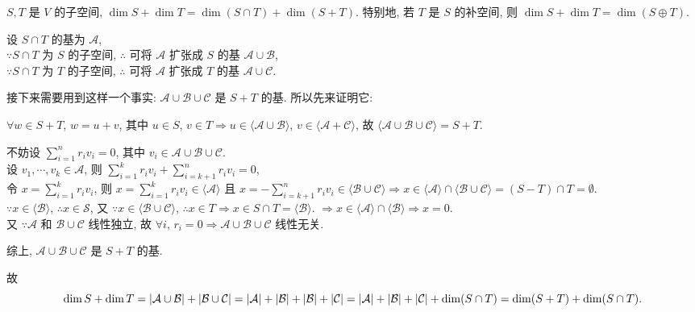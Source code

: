 \documentclass{note}
\begin{document}
\begin{thm}[(课本定理 1.14)]
    $S,T$ 是 $V$ 的子空间, $\dim S+\dim T=\dim(S\cap T)+\dim(S+T)$. 特别地, 若 $T$ 是 $S$ 的补空间, 则 $\dim S+\dim T=\dim(S\oplus T)$.
\end{thm}
\begin{pf}
    设 $S\cap T$ 的基为 $\mathcal{A}$,\\
    $\because S\cap T$ 为 $S$ 的子空间, $\therefore$ 可将 $\mathcal{A}$ 扩张成 $S$ 的基 $\mathcal{A}\cup\mathcal{B}$,\\
    $\because S\cap T$ 为 $T$ 的子空间, $\therefore$ 可将 $\mathcal{A}$ 扩张成 $T$ 的基 $\mathcal{A}\cup\mathcal{C}$.

    接下来需要用到这样一个事实: $\mathcal{A}\cup\mathcal{B}\cup\mathcal{C}$ 是 $S+T$ 的基. 所以先来证明它:
    \begin{pf}
        $\forall w\in S+T$, $w=u+v$, 其中 $u\in S$, $v\in T\Longrightarrow u\in \langle\mathcal{A}\cup\mathcal{B}\rangle$, $v\in\langle\mathcal{A}+\mathcal{C}\rangle$, 故 $\langle\mathcal{A}\cup\mathcal{B}\cup\mathcal{C}\rangle=S+T$.

        不妨设 $\sum_{i=1}^nr_iv_i=0$, 其中 $v_i\in\mathcal{A}\cup\mathcal{B}\cup\mathcal{C}$.\\
        设 $v_1,\cdots,v_k\in\mathcal{A}$, 则 $\sum_{i=1}^kr_iv_i+\sum_{i=k+1}^nr_iv_i=0$,\\
        令 $x=\sum_{i=1}^kr_iv_i$, 则 $x=\sum_{i=1}^kr_iv_i\in\langle\mathcal{A}\rangle$ 且 $x=-\sum_{i=k+1}^nr_iv_i\in\langle\mathcal{B}\cup\mathcal{C}\rangle\Longrightarrow x\in\langle\mathcal{A}\rangle\cap\langle\mathcal{B}\cup\mathcal{C}\rangle=(S-T)\cap T=\emptyset$.\\
        $\because x\in\langle\mathcal{B}\rangle$, $\therefore x\in\mathcal{S}$, 又 $\because x\in \langle\mathcal{B}\cup\mathcal{C}\rangle$, $\therefore x\in T\Longrightarrow x\in S\cap T=\langle\mathcal{B}\rangle$.
        $\Longrightarrow x\in\langle\mathcal{A}\rangle\cap\langle\mathcal{B}\rangle\Longrightarrow x=0$.\\
        又 $\because\mathcal{A}$ 和 $\mathcal{B}\cup\mathcal{C}$ 线性独立, 故 $\forall i$, $r_i=0\Longrightarrow\mathcal{A}\cup\mathcal{B}\cup\mathcal{C}$ 线性无关.

        综上, $\mathcal{A}\cup\mathcal{B}\cup\mathcal{C}$ 是 $S+T$ 的基.
    \end{pf}

    故 $$\dim S+\dim T=\left\lvert\mathcal{A}\cup\mathcal{B}\right\rvert+\left\lvert\mathcal{B}\cup\mathcal{C}\right\rvert=\left\lvert\mathcal{A}\right\rvert+\left\lvert\mathcal{B}\right\rvert+\left\lvert\mathcal{B}\right\rvert+\left\lvert\mathcal{C}\right\rvert=\left\lvert\mathcal{A}\right\rvert+\left\lvert\mathcal{B}\right\rvert+\left\lvert\mathcal{C}\right\rvert+\dim(S\cap T)=\dim(S+T)+\dim(S\cap T).$$
\end{pf}
\ifx\allfiles\undefined
\end{document}

